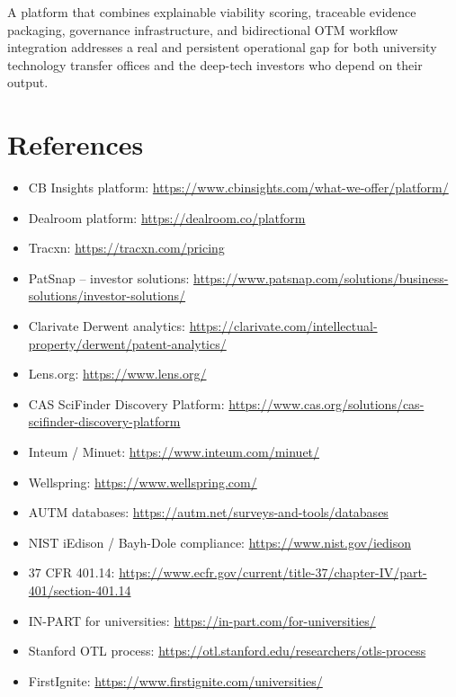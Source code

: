 \documentclass[11pt]{article}
\begin{document}
\vspace{6pt}
\begin{opportunitybox}
  A platform that combines explainable viability scoring, traceable evidence
  packaging, governance infrastructure, and bidirectional OTM workflow integration
  addresses a real and persistent operational gap for both university technology
  transfer offices and the deep-tech investors who depend on their output.
\end{opportunitybox}

\section*{References}
\small
{}
\begin{itemize}
  \item CB Insights platform: \url{https://www.cbinsights.com/what-we-offer/platform/}
  \item Dealroom platform: \url{https://dealroom.co/platform}
  \item Tracxn: \url{https://tracxn.com/pricing}
  \item PatSnap -- investor solutions: \url{https://www.patsnap.com/solutions/business-solutions/investor-solutions/}
  \item Clarivate Derwent analytics: \url{https://clarivate.com/intellectual-property/derwent/patent-analytics/}
  \item Lens.org: \url{https://www.lens.org/}
  \item CAS SciFinder Discovery Platform: \url{https://www.cas.org/solutions/cas-scifinder-discovery-platform}
  \item Inteum / Minuet: \url{https://www.inteum.com/minuet/}
  \item Wellspring: \url{https://www.wellspring.com/}
  \item AUTM databases: \url{https://autm.net/surveys-and-tools/databases}
  \item NIST iEdison / Bayh-Dole compliance: \url{https://www.nist.gov/iedison}
  \item 37 CFR 401.14: \url{https://www.ecfr.gov/current/title-37/chapter-IV/part-401/section-401.14}
  \item IN-PART for universities: \url{https://in-part.com/for-universities/}
  \item Stanford OTL process: \url{https://otl.stanford.edu/researchers/otls-process}
  \item FirstIgnite: \url{https://www.firstignite.com/universities/}
\end{itemize}
\end{document}
